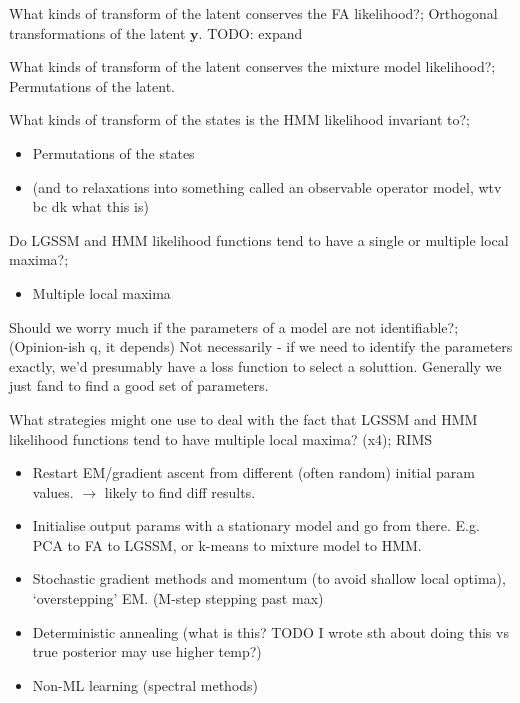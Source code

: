 \documentclass{article}
\begin{document}
What kinds of transform of the latent conserves the FA likelihood?; Orthogonal transformations of the latent $\mathbf{y}$. TODO: expand

What kinds of transform of the latent conserves the mixture model likelihood?; Permutations of the latent.

What kinds of transform of the states is the HMM likelihood invariant to?; \begin{itemize} \item Permutations of the states \item (and to relaxations into something called an observable operator model, wtv bc dk what this is) \end{itemize}

Do LGSSM and HMM likelihood functions tend to have a single or multiple local maxima?; \begin{itemize} \item Multiple local maxima \end{itemize}

Should we worry much if the parameters of a model are not identifiable?; (Opinion-ish q, it depends) Not necessarily - if we need to identify the parameters exactly, we'd presumably have a loss function to select a soluttion. Generally we just fand to find a good set of parameters.

What strategies might one use to deal with the fact that LGSSM and HMM likelihood functions tend to have multiple local maxima? (x4); RIMS \begin{itemize} \item Restart EM/gradient ascent from different (often random) initial param values. $\rightarrow$ likely to find diff results. \item Initialise output params with a stationary model and go from there. E.g. PCA to FA to LGSSM, or k-means to mixture model to HMM. \item Stochastic gradient methods and momentum (to avoid shallow local optima), `overstepping' EM. (M-step stepping past max) \item Deterministic annealing (what is this? TODO I wrote sth about doing this vs true posterior may use higher temp?) \item Non-ML learning (spectral methods) \end{itemize}
\end{document}
